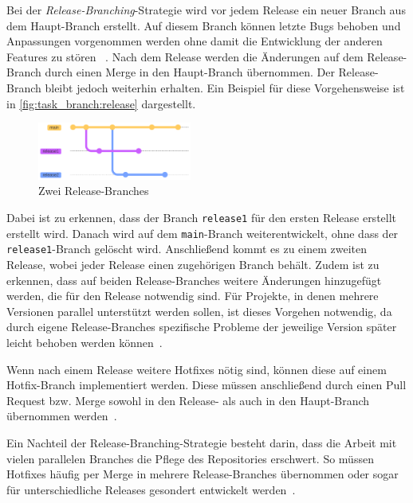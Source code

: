 Bei der \emph{Release\hyp Branching}\hyp Strategie wird vor jedem Release ein neuer Branch aus dem Haupt\hyp Branch erstellt. Auf diesem Branch können letzte Bugs behoben und Anpassungen vorgenommen werden ohne damit die Entwicklung der anderen Features zu stören ~\cite{tucker_basics_2023}. Nach dem Release werden die Änderungen auf dem Release\hyp Branch durch einen Merge in den Haupt\hyp Branch übernommen. Der Release\hyp Branch bleibt jedoch weiterhin erhalten. Ein Beispiel für diese Vorgehensweise ist in \autoref{fig:task_branch:release} dargestellt.

\begin{figure}
    \includegraphics[width=0.45\textwidth]{src/assets/diagrams/task_branch/release-branch.pdf}
    \caption{Zwei Release\hyp Branches}
    \label{fig:task_branch:release}
\end{figure}

Dabei ist zu erkennen, dass der Branch \texttt{release1} für den ersten Release erstellt erstellt wird. Danach wird auf dem \texttt{main}\hyp Branch weiterentwickelt, ohne dass der \texttt{release1}-Branch gelöscht wird. Anschließend kommt es zu einem zweiten Release, wobei jeder Release einen zugehörigen Branch behält. Zudem ist zu erkennen, dass auf beiden Release\hyp Branches weitere Änderungen hinzugefügt werden, die für den Release notwendig sind.
Für Projekte, in denen mehrere Versionen parallel unterstützt werden sollen, ist dieses Vorgehen notwendig, da durch eigene Release\hyp Branches spezifische Probleme der jeweilige Version später leicht behoben werden können~\cite{hart_besten_2020}.

Wenn nach einem Release weitere Hotfixes nötig sind, können diese auf einem Hotfix\hyp Branch implementiert werden. Diese müssen anschließend durch einen Pull Request bzw. Merge sowohl in den Release- als auch in den Haupt\hyp Branch übernommen werden~\cite{tucker_basics_2023}.

Ein Nachteil der Release\hyp Branching\hyp Strategie besteht darin, dass die Arbeit mit vielen parallelen Branches die Pflege des Repositories erschwert. So müssen Hotfixes häufig per Merge in mehrere Release\hyp Branches übernommen oder sogar für unterschiedliche Releases gesondert entwickelt werden~\cite{hart_besten_2020}.


